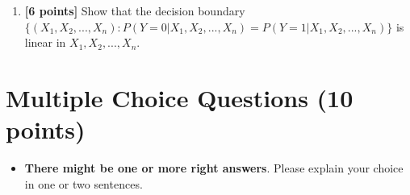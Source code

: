 \documentclass{article}
\newenvironment{soln}{
	\leavevmode\color{blue}\ignorespaces
}{}
\begin{document}
\begin{enumerate}
\begin{enumerate}
\begin{soln}
\end{soln}


\item\textbf{[6 points]} Show that the decision boundary $\{(X_1,X_2,...,X_n): P(Y=0|X_1,X_2,...,X_n) = P(Y=1|X_1,X_2,...,X_n)\}$ is linear in $X_1,X_2,...,X_n$.\\
\begin{soln}

\end{soln}

\end{enumerate}

\end{enumerate}


\newpage

\section{Multiple Choice Questions (10 points)}
\begin{itemize}
\item \textbf{There might be one or more right answers}. Please explain your choice in one or two sentences.
\end{itemize}
\end{document}
